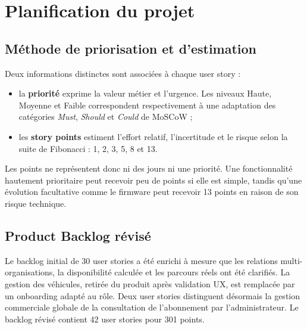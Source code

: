 \section{Planification du projet}

\subsection{Méthode de priorisation et d'estimation}

Deux informations distinctes sont associées à chaque user story :

\begin{itemize}[leftmargin=7mm]
  \item la \textbf{priorité} exprime la valeur métier et l'urgence. Les niveaux Haute,
  Moyenne et Faible correspondent respectivement à une adaptation des catégories
  \emph{Must}, \emph{Should} et \emph{Could} de MoSCoW ;
  \item les \textbf{story points} estiment l'effort relatif, l'incertitude et le risque
  selon la suite de Fibonacci : 1, 2, 3, 5, 8 et 13.
\end{itemize}

Les points ne représentent donc ni des jours ni une priorité. Une fonctionnalité
hautement prioritaire peut recevoir peu de points si elle est simple, tandis qu'une
évolution facultative comme le firmware peut recevoir 13 points en raison de son
risque technique.

\subsection{Product Backlog révisé}

Le backlog initial de 30 user stories a été enrichi à mesure que les relations
multi-organisations, la disponibilité calculée et les parcours réels ont été
clarifiés. La gestion des véhicules, retirée du produit après validation UX, est
remplacée par un onboarding adapté au rôle. Deux user stories distinguent désormais
la gestion commerciale globale de la consultation de l'abonnement par
l'administrateur. Le backlog révisé contient 42 user stories pour 301 points.

